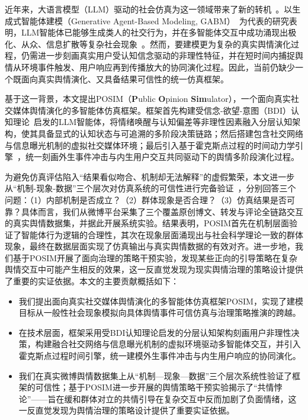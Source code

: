 \documentclass[a4paper,fleqn]{cas-dc}
\begin{document}
近年来，大语言模型（LLM）驱动的社会仿真为这一领域带来了新的转机~\citep{wang_survey_2024}。以生成式智能体建模（Generative Agent-Based Modeling, GABM）~\citep{park_generative_2023}为代表的研究表明，LLM智能体已能够生成类人的社交行为，并在多智能体交互中成功涌现出极化、从众、信息扩散等复杂社会现象~\citep{gao_s3_2023,chuang_simulating_2024}。然而，要建模更为复杂的真实舆情演化过程，仍需进一步刻画真实用户受认知信念驱动的非理性特征，并在短时间内捕捉舆情从环境事件触发、用户响应再到传播放大的协同演化过程。因此，当前仍缺少一个既面向真实舆情演化、又具备结果可信性的统一仿真框架。

基于这一背景，本文提出POSIM（\textbf{P}ublic \textbf{O}pinion \textbf{Sim}ulator），一个面向真实社交媒体舆情演化的多智能体仿真框架。框架首先构建受信念-欲望-意图（BDI）认知理论~\citep{bratman_intention_1987,rao_bdi_1995}启发的LLM智能体，将情绪唤醒与认知偏差等非理性因素融入分层认知架构，使其具备显式的认知状态与可追溯的多阶段决策链路；然后搭建包含社交网络与信息曝光机制的虚拟社交媒体环境；最后引入基于霍克斯点过程的时间动力学引擎~\citep{hawkes_spectra_1971}，统一刻画外生事件冲击与内生用户交互共同驱动下的舆情多阶段演化过程。

为避免仿真评估陷入“结果看似吻合、机制却无法解释”的虚假繁荣，本文进一步从“机制-现象-数据”三个层次对仿真系统的可信性进行完备验证~\citep{sargent_verification_2013}，分别回答三个问题：（1）内部机制是否成立？（2）群体现象是否合理？（3）仿真结果是否可靠？具体而言，我们从微博平台采集了三个覆盖原创博文、转发与评论全链路交互的真实舆情数据集，并据此开展系统实验。结果表明，POSIM首先在机制层面验证了智能体行为逻辑的合理性，其次在现象层面涌现出与社会科学理论一致的群体现象，最终在数据层面实现了仿真输出与真实舆情数据的有效对齐。进一步地，我们基于POSIM开展了面向治理的策略干预实验，发现某些正向的引导策略在复杂舆情交互中可能产生相反的效果，这一反直觉发现为现实舆情治理的策略设计提供了重要的实证依据。本文的主要贡献概括如下：

\begin{itemize}[leftmargin=1.5em, labelsep=0.5em, label={\textbullet}]
\item 我们提出面向真实社交媒体舆情演化的多智能体仿真框架POSIM，实现了建模目标从一般性社会现象模拟向具体舆情事件可信仿真与治理策略推演的跨越。
\item 在技术层面，框架采用受BDI认知理论启发的分层认知架构刻画用户非理性决策，构建融合社交网络与信息曝光机制的虚拟环境驱动多智能体交互，并引入霍克斯点过程时间引擎，统一建模外生事件冲击与内生用户响应的协同演化。
\item 我们在真实微博舆情数据集上从“机制—现象—数据”三个层次系统性验证了框架的可信性；基于POSIM进一步开展的舆情策略干预实验揭示了“共情悖论”——旨在缓和群体对立的共情引导在复杂交互中反而加剧了负面情绪，这一反直觉发现为舆情治理的策略设计提供了重要实证依据。
\end{itemize}
\end{document}
